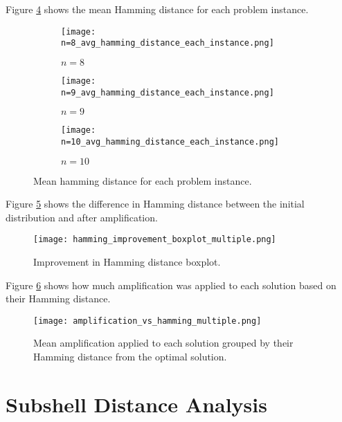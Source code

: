Figure \ref{fig:avg ham} shows the mean Hamming distance for each problem instance.
\begin{figure}[htbp]
     \centering
     \begin{subfigure}{0.45\textwidth}
         \centering
         \texttt{[image: n=8\_avg\_hamming\_distance\_each\_instance.png]}
         \caption{$n=8$}
         \label{fig:avg ham 8}
     \end{subfigure}
     \hfill
     \begin{subfigure}{0.45\textwidth}
         \centering
         \texttt{[image: n=9\_avg\_hamming\_distance\_each\_instance.png]}
         \caption{$n=9$}
         \label{fig:avg ham 9}
     \end{subfigure}
     \hfill
     \begin{subfigure}{\textwidth}
         \centering
         \texttt{[image: n=10\_avg\_hamming\_distance\_each\_instance.png]}
         \caption{$n=10$}
         \label{fig:avg ham 10}
     \end{subfigure}
        \caption{Mean hamming distance for each problem instance.}
        \label{fig:avg ham}
\end{figure}

Figure \ref{fig:ham improvement} shows the difference in Hamming distance between the initial distribution and after amplification.
\begin{figure}[htbp]
    \centering
    \texttt{[image: hamming\_improvement\_boxplot\_multiple.png]}
    \caption{Improvement in Hamming distance boxplot.}
    \label{fig:ham improvement}
\end{figure}

Figure \ref{fig:amp vs ham} shows how much amplification was applied to each solution based on their Hamming distance.
\begin{figure}[htbp]
    \centering
    \texttt{[image: amplification\_vs\_hamming\_multiple.png]}
    \caption{Mean amplification applied to each solution grouped by their Hamming distance from the optimal solution.}
    \label{fig:amp vs ham}
\end{figure}



\section{Subshell Distance Analysis}

